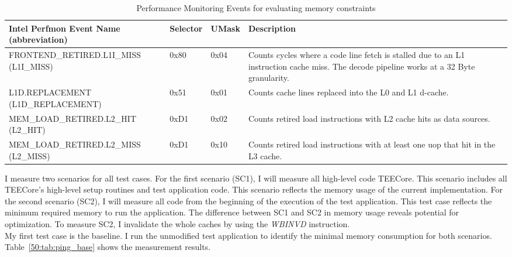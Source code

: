 \begin{table}[ht]
  \centering
  \begin{tabular}{ |p{6cm}|p{1.35cm}|p{1.25cm}|p{4cm}|}
    \hline
    \makecell[l]{Intel Perfmon Event Name \\ (abbreviation)} & Selector & UMask & Description                                                                      \\
    \hline
    \makecell[l]{FRONTEND\_RETIRED.L1I\_MISS\\ (L1I\_MISS)}  & 0x80     & 0x04  & Counts cycles where a code line fetch is stalled due to an L1 instruction cache miss. The decode pipeline works at a 32 Byte granularity. \\
    \makecell[l]{L1D.REPLACEMENT \\ (L1D\_REPLACEMENT)}      & 0x51     & 0x01  & Counts cache lines replaced into the L0 and L1 d-cache.                          \\
    MEM\_LOAD\_RETIRED.L2\_HIT (L2\_HIT)                     & 0xD1     & 0x02  & Counts retired load instructions with L2 cache hits as data sources.             \\
    MEM\_LOAD\_RETIRED.L2\_MISS (L2\_MISS)                   & 0xD1     & 0x10  & Counts retired load instructions with at least one uop that hit in the L3 cache. \\
    \hline
  \end{tabular}
  \caption{Performance Monitoring Events for evaluating memory constraints}
  \label{50:tab:events}
\end{table}

I measure two scenarios for all test cases. For the first scenario (SC1), I will
measure all high-level code TEECore. This scenario includes all TEECore's
high-level setup routines and test application code. This scenario reflects the
memory usage of the current implementation. For the second scenario (SC2), I
will measure all code from the beginning of the execution of the test
application. This test case reflects the minimum required memory to run the
application. The difference between SC1 and SC2 in memory usage reveals
potential for optimization. To measure SC2, I invalidate the whole caches by
using the \textit{WBINVD} instruction. \\

My first test case is the baseline. I run the unmodified test application to
identify the minimal memory consumption for both scenarios.
Table~\ref{50:tab:ping_base} shows the measurement results. 

